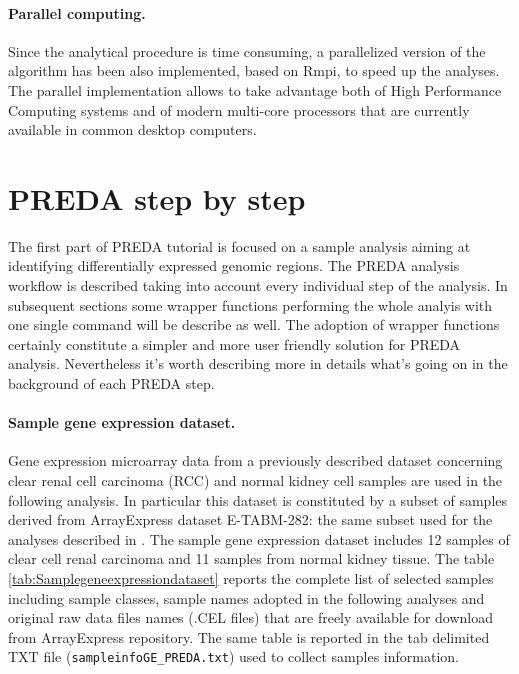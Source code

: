 \documentclass[a4paper,10pt]{article}
\begin{document}
\paragraph{Parallel computing.} Since the analytical procedure is time consuming, a parallelized version of the algorithm has been also implemented, based on Rmpi, to speed up the analyses. The parallel implementation allows to take advantage both of High Performance Computing systems and of modern multi-core processors that are currently available in common desktop computers.



\section{PREDA step by step}
The first part of PREDA tutorial is focused on a sample analysis aiming at identifying differentially expressed genomic regions. The PREDA analysis workflow is described taking into account every individual step of the analysis. In subsequent sections some wrapper functions performing the whole analyis with one single command will be describe as well. The adoption of wrapper functions certainly constitute a simpler and more user friendly solution for PREDA analysis. Nevertheless it's worth describing more in details what's going on in the background of each PREDA step.

\paragraph{Sample gene expression dataset.} Gene expression microarray data from a previously described dataset \cite{PubMed_19542187,PubMed_18194544} concerning clear renal cell carcinoma (RCC) and normal kidney cell samples are used in the following analysis. In particular this dataset is constituted by a subset of samples derived from ArrayExpress dataset E-TABM-282: the same subset used for the analyses described in \cite{PubMed_19542187}. The sample gene expression dataset includes 12 samples of clear cell renal carcinoma and 11 samples from normal kidney tissue. The table \ref{tab:Samplegeneexpressiondataset} reports the complete list of selected samples including sample classes, sample names adopted in the following analyses and original raw data files names (.CEL files) that are freely available for download from ArrayExpress repository. The same table is reported in the tab delimited TXT file (\texttt{sampleinfoGE\_PREDA.txt}) used to collect samples information.
\end{document}
